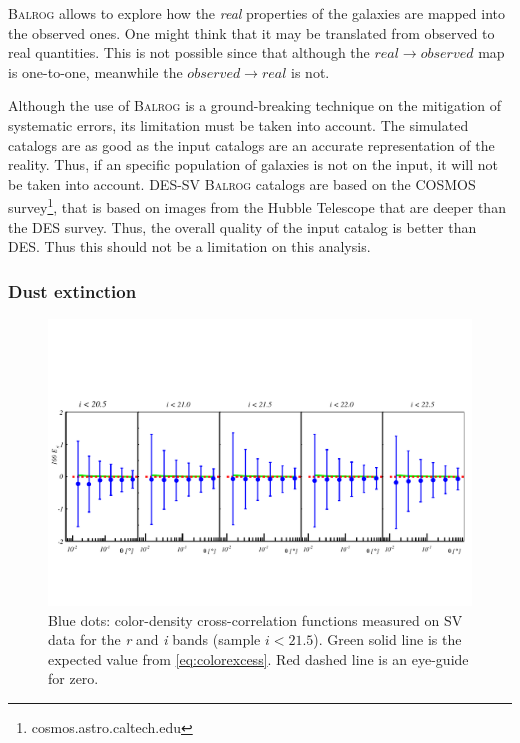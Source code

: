 {\scshape Balrog} allows to explore how the {\it real} properties of the galaxies are mapped into the observed ones. One might think that it may be translated from observed to real quantities. This is not possible since that although the $real\rightarrow observed$ map is one-to-one, meanwhile the $observed\rightarrow real$ is not.
\newline

Although the use of {\scshape Balrog} is a ground-breaking technique on the mitigation of systematic errors, its limitation must be taken into account. The simulated catalogs are as good as the input catalogs are an accurate representation of the reality. Thus, if an specific population of galaxies is not on the input, it will not be taken into account. DES-SV {\scshape Balrog} catalogs are based on the {\scshape COSMOS} survey\footnote{cosmos.astro.caltech.edu}, that is based on images from the Hubble Telescope that are deeper than the DES survey. Thus, the overall quality of the input catalog is better than DES. Thus this should not be a limitation on this analysis.

\subsubsection{Dust extinction}
\label{sec:dustext}

\begin{figure}
\includegraphics[width=\textwidth,trim={0 2.3cm 0 3.5cm},clip]{./figures/mag_i_ri.pdf}
\caption{Blue dots: color-density cross-correlation functions measured on SV data for the {\it r} and {\it i} bands (sample $i<21.5$). Green solid line is the expected value from \autoref{eq:colorexcess}. Red dashed line is an eye-guide for zero.}
\label{fig:colorexcess}
\end{figure}


